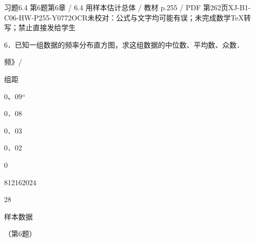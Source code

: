 \begin{bankitem}{习题6.4 第6题}{第6章 / 6.4 用样本估计总体 / 教材 p.255 / PDF 第262页}{XJ-B1-C06-HW-P255-Y0772}{OCR未校对：公式与文字均可能有误；未完成数学TeX转写；禁止直接发给学生}
\begin{ocrdraft}
\par
6．已知一组数据的频率分布直方图，求这组数据的中位数、平均数、众数．
\par
频》/
\par
组距
\par
0、09“
\par
0．08
\par
0．03
\par
0．02
\par
0
\par
812162024
\par
28
\par
样本数据
\par
（第6题）
\end{ocrdraft}
\end{bankitem}

